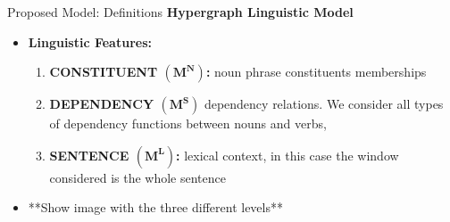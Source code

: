 \documentclass[10pt,xcolor=table]{beamer}
\begin{document}
\begin{frame}{Proposed Model: Definitions}
\large \textbf{Hypergraph Linguistic Model}
\begin{itemize}
	
	\item \textbf{Linguistic Features:}
	\begin{enumerate}
		\item \textbf{CONSTITUENT $\mathbf{(M^N)}$:} noun phrase constituents memberships
		\item \textbf{DEPENDENCY $\mathbf{(M^S)}$} dependency relations. We consider all types of dependency functions between nouns and verbs,
		\item \textbf{SENTENCE $\mathbf{(M^L)}$:} lexical context, in this case the window considered is the whole sentence
	\end{enumerate}
	\item **Show image with the three different levels**
\end{itemize}
\centering
\vspace{\textheight}
\end{frame}
\end{document}
